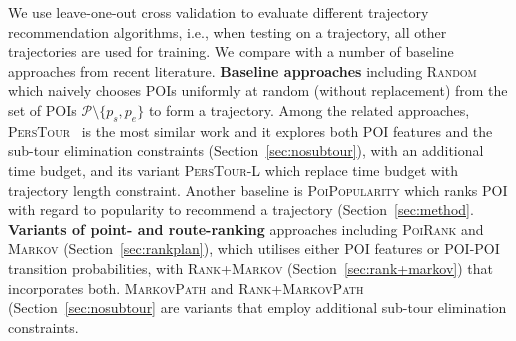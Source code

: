 We use leave-one-out cross validation to evaluate different trajectory recommendation algorithms,
i.e., when testing on a trajectory, all other trajectories are used for training.
We compare with a number of baseline approaches from recent literature.
%
{\bf Baseline approaches} including \textsc{Random} which naively chooses POIs uniformly at random
(without replacement) from the set of POIs $\mathcal{P} \setminus \{p_s, p_e \}$ to form a trajectory.
Among the related approaches, \textsc{PersTour}~\cite{ijcai15} is the most similar work and it
explores both POI features and the sub-tour elimination constraints (Section~\ref{sec:nosubtour}),
with an additional time budget, and its variant \textsc{PersTour-L} which replace time budget with
trajectory length constraint.
Another baseline is \textsc{PoiPopularity} %
which ranks POI with regard to popularity to recommend a trajectory (Section~\ref{sec:method}.
%
{\bf Variants of point- and route-ranking} approaches including \textsc{PoiRank} and \textsc{Markov} (Section~\ref{sec:rankplan}),
which utilises either POI features or POI-POI transition probabilities,
with \textsc{Rank+Markov} (Section~\ref{sec:rank+markov}) that incorporates both. %
\textsc{MarkovPath} and \textsc{Rank+MarkovPath} (Section~\ref{sec:nosubtour} are variants that employ 
additional sub-tour elimination constraints.


